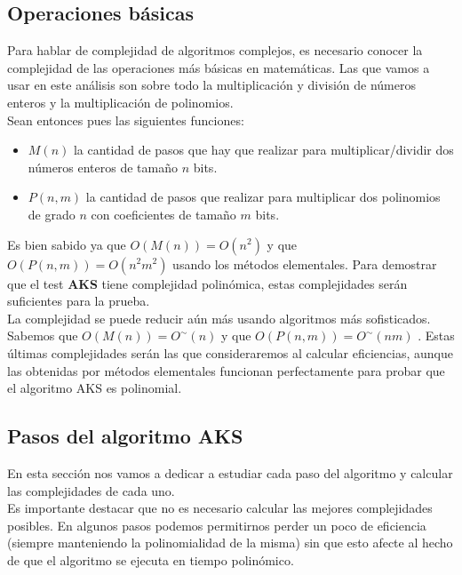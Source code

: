 \subsection{Operaciones básicas}

Para hablar de complejidad de algoritmos complejos, es necesario conocer la complejidad de las operaciones más básicas en matemáticas. Las que vamos a usar en este análisis son sobre todo la multiplicación y división de números enteros y la multiplicación de polinomios.\\

Sean entonces pues las siguientes funciones:\\

\begin{itemize}
	\item $M(n)$ la cantidad de pasos que hay que realizar para multiplicar/dividir dos números enteros de tamaño $n$ bits.
	
	\item $P(n, m)$ la cantidad de pasos que realizar para multiplicar dos polinomios de grado $n$ con coeficientes de tamaño $m$ bits.
\end{itemize}

Es bien sabido ya que $O(M(n)) = O(n^2)$ y que $O(P(n, m)) = O(n^2m^2)$ usando los métodos elementales. Para demostrar que el test \textbf{AKS} tiene complejidad polinómica, estas complejidades serán suficientes para la prueba.\\

La complejidad se puede reducir aún más usando algoritmos más sofisticados. Sabemos que $O(M(n)) = O^\sim(n)$ y que $O(P(n, m)) = O^\sim(nm)$ \cite{modern_computer_algebra}. Estas últimas complejidades serán las que consideraremos al calcular eficiencias, aunque las obtenidas por métodos elementales funcionan perfectamente para probar que el algoritmo AKS es polinomial.

\subsection{Pasos del algoritmo AKS}

En esta sección nos vamos a dedicar a estudiar cada paso del algoritmo y calcular las complejidades de cada uno.\\

Es importante destacar que no es necesario calcular las mejores complejidades posibles. En algunos pasos podemos permitirnos perder un poco de eficiencia (siempre manteniendo la polinomialidad de la misma) sin que esto afecte al hecho de que el algoritmo se ejecuta en tiempo polinómico.

